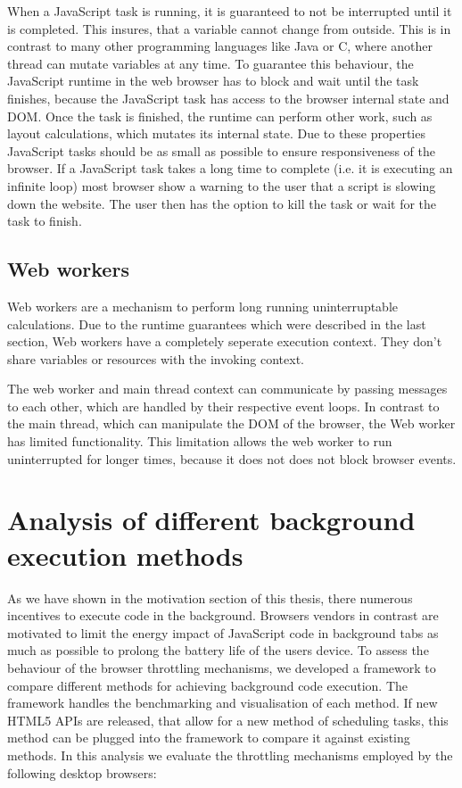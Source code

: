 \documentclass[article,type=bsc,colorback,accentcolor=tud9c]{tudthesis}
\begin{document}
  When a JavaScript task is running, it is guaranteed to not be interrupted until it is completed. This insures, that a variable cannot change from outside. This is in contrast to many other programming languages like Java or C, where another thread can mutate variables at any time. To guarantee this behaviour, the JavaScript runtime in the web browser has to block and wait until the task finishes, because the JavaScript task has access to the browser internal state and DOM. Once the task is finished, the runtime can perform other work, such as layout calculations, which mutates its internal state. Due to these properties JavaScript tasks should be as small as possible to ensure responsiveness of the browser. If a JavaScript task takes a long time to complete (i.e. it is executing an infinite loop) most browser show a warning to the user that a script is slowing down the website. The user then has the option to kill the task or wait for the task to finish.
  
  
  \subsection{Web workers}

  Web workers are a mechanism to perform long running uninterruptable calculations. Due to the runtime guarantees which were described in the last section, Web workers have a completely seperate execution context. They don't share variables or resources with the invoking context.

  The web worker and main thread context can communicate by passing messages to each other, which are handled by their respective event loops. In contrast to the main thread, which can manipulate the DOM of the browser, the Web worker has limited functionality. This limitation allows the web worker to run uninterrupted for longer times, because it does not does not block browser events.


  
  \newpage
  \section{Analysis of different background execution methods}

  As we have shown in the motivation section of this thesis, there numerous incentives to execute code in the background. Browsers vendors in contrast are motivated to limit the energy impact of JavaScript code in background tabs as much as possible to prolong the battery life of the users device. To assess the behaviour of the browser throttling mechanisms, we developed a framework to compare different methods for achieving background code execution. The framework handles the benchmarking and visualisation of each method. If new HTML5 APIs are released, that allow for a new method of scheduling tasks, this method can be plugged into the framework to compare it against existing methods. In this analysis we evaluate the throttling mechanisms employed by the following desktop browsers:
\end{document}
